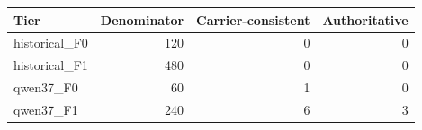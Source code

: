 \begin{tabular}{lrrr}
\toprule
Tier & Denominator & Carrier-consistent & Authoritative \\
\midrule
historical\_F0 & 120 & 0 & 0 \\
historical\_F1 & 480 & 0 & 0 \\
qwen37\_F0 & 60 & 1 & 0 \\
qwen37\_F1 & 240 & 6 & 3 \\
\bottomrule
\end{tabular}
